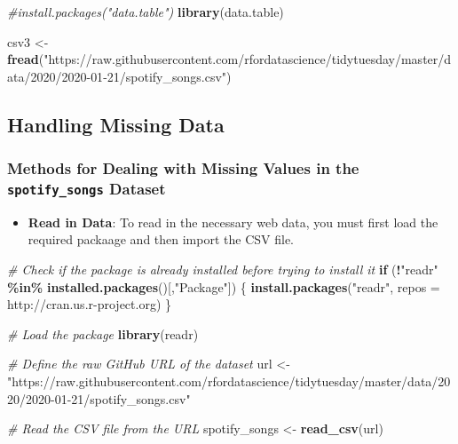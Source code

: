 \documentclass[
]{book}
\newenvironment{Shaded}{\begin{snugshade}}{\end{snugshade}}
\newcommand{\AttributeTok}[1]{\textcolor[rgb]{0.13,0.29,0.53}{#1}}
\newcommand{\CommentTok}[1]{\textcolor[rgb]{0.56,0.35,0.01}{\textit{#1}}}
\newcommand{\ControlFlowTok}[1]{\textcolor[rgb]{0.13,0.29,0.53}{\textbf{#1}}}
\newcommand{\FunctionTok}[1]{\textcolor[rgb]{0.13,0.29,0.53}{\textbf{#1}}}
\newcommand{\NormalTok}[1]{#1}
\newcommand{\OtherTok}[1]{\textcolor[rgb]{0.56,0.35,0.01}{#1}}
\newcommand{\SpecialCharTok}[1]{\textcolor[rgb]{0.81,0.36,0.00}{\textbf{#1}}}
\newcommand{\StringTok}[1]{\textcolor[rgb]{0.31,0.60,0.02}{#1}}
\providecommand{\tightlist}{%
  \setlength{\itemsep}{0pt}\setlength{\parskip}{0pt}}
\begin{document}
\begin{Shaded}
\begin{Highlighting}[]
\CommentTok{\#install.packages("data.table")}
\FunctionTok{library}\NormalTok{(data.table)}

\NormalTok{csv3 }\OtherTok{\textless{}{-}} \FunctionTok{fread}\NormalTok{(}\StringTok{"https://raw.githubusercontent.com/rfordatascience/tidytuesday/master/data/2020/2020{-}01{-}21/spotify\_songs.csv"}\NormalTok{)}
\end{Highlighting}
\end{Shaded}

\subsection*{Handling Missing Data}\label{handling-missing-data}

\subsubsection*{\texorpdfstring{Methods for Dealing with Missing Values in the \texttt{spotify\_songs} Dataset}{Methods for Dealing with Missing Values in the spotify\_songs Dataset}}\label{methods-for-dealing-with-missing-values-in-the-spotify_songs-dataset}

\begin{itemize}
\tightlist
\item
  \textbf{Read in Data}: To read in the necessary web data, you must first load the required packaage and then import the CSV file.
\end{itemize}

\begin{Shaded}
\begin{Highlighting}[]
\CommentTok{\# Check if the package is already installed before trying to install it}
\ControlFlowTok{if}\NormalTok{ (}\SpecialCharTok{!}\StringTok{"readr"} \SpecialCharTok{\%in\%} \FunctionTok{installed.packages}\NormalTok{()[,}\StringTok{"Package"}\NormalTok{]) \{}
  \FunctionTok{install.packages}\NormalTok{(}\StringTok{"readr"}\NormalTok{, }\AttributeTok{repos =} \StringTok{\textquotesingle{}http://cran.us.r{-}project.org\textquotesingle{}}\NormalTok{)}
\NormalTok{\}}

\CommentTok{\# Load the package}
\FunctionTok{library}\NormalTok{(readr)}

\CommentTok{\# Define the raw GitHub URL of the dataset}
\NormalTok{url }\OtherTok{\textless{}{-}} \StringTok{"https://raw.githubusercontent.com/rfordatascience/tidytuesday/master/data/2020/2020{-}01{-}21/spotify\_songs.csv"}

\CommentTok{\# Read the CSV file from the URL}
\NormalTok{spotify\_songs }\OtherTok{\textless{}{-}} \FunctionTok{read\_csv}\NormalTok{(url)}
\end{Highlighting}
\end{Shaded}
\end{document}
